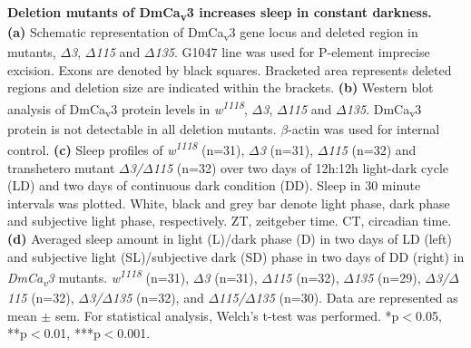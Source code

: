 \label{fig:S2}
\textbf{Deletion mutants of DmCa\textsubscript{v}3 increases sleep in constant darkness.}
\\
\textbf{(a)} Schematic representation of DmCa\textsubscript{v}3 gene locus and deleted region in mutants, \emph{$\Delta$3}, \emph{$\Delta$115} and \emph{$\Delta$135}.
G1047 line was used for P-element imprecise excision.
Exons are denoted by black squares.
Bracketed area represents deleted regions and deletion size are indicated within the brackets.
\textbf{(b)} Western blot analysis of DmCa\textsubscript{v}3 protein levels in \emph{w\textsuperscript{1118}}, \emph{$\Delta$3}, \emph{$\Delta$115} and \emph{$\Delta$135}.
DmCa\textsubscript{v}3 protein is not detectable in all deletion mutants.
$\beta$-actin was used for internal control.
\textbf{(c)} Sleep profiles of \emph{w\textsuperscript{1118}} (n=31), \emph{$\Delta$3} (n=31), \emph{$\Delta$115} (n=32) and transhetero mutant \emph{$\Delta$3/$\Delta$115} (n=32) over two days of 12h:12h light-dark cycle (LD) and two days of continuous dark condition (DD).
Sleep in 30 minute intervals was plotted.
White, black and grey bar denote light phase, dark phase and subjective light phase, respectively.
ZT, zeitgeber time.
CT, circadian time.
\textbf{(d)} Averaged sleep amount in light (L)/dark phase (D) in two days of LD (left) and subjective light (SL)/subjective dark (SD) phase in two days of DD (right) in \emph{DmCa\textsubscript{v}3} mutants.
\emph{w\textsuperscript{1118}} (n=31), \emph{$\Delta$3} (n=31), \emph{$\Delta$115} (n=32), \emph{$\Delta$135} (n=29), \emph{$\Delta$3/$\Delta$115} (n=32), \emph{$\Delta$3/$\Delta$135} (n=32), and \emph{$\Delta$115/$\Delta$135} (n=30).
Data are represented as mean $\pm$ sem.
For statistical analysis, Welch's t-test was performed.
*p$<$0.05, **p$<$0.01, ***p$<$0.001.
  
  
  